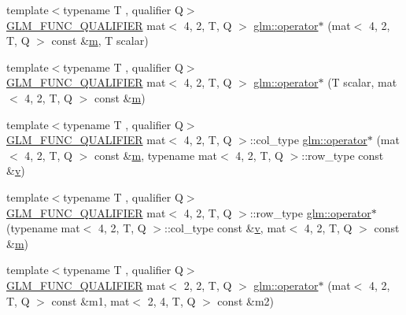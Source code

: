\begin{DoxyCompactItemize}
\item 
{\footnotesize template$<$typename T , qualifier Q$>$ }\\\hyperlink{setup_8hpp_a33fdea6f91c5f834105f7415e2a64407}{G\+L\+M\+\_\+\+F\+U\+N\+C\+\_\+\+Q\+U\+A\+L\+I\+F\+I\+ER} mat$<$ 4, 2, T, Q $>$ \hyperlink{namespaceglm_a09d03d89ff90db594947d1f1343e1b91}{glm\+::operator$\ast$} (mat$<$ 4, 2, T, Q $>$ const \&\hyperlink{_s_d_l__opengl__glext_8h_af593500c283bf1a787a6f947f503a5c2}{m}, T scalar)
\item 
{\footnotesize template$<$typename T , qualifier Q$>$ }\\\hyperlink{setup_8hpp_a33fdea6f91c5f834105f7415e2a64407}{G\+L\+M\+\_\+\+F\+U\+N\+C\+\_\+\+Q\+U\+A\+L\+I\+F\+I\+ER} mat$<$ 4, 2, T, Q $>$ \hyperlink{namespaceglm_a4d746e28b9997c4e8223605503469343}{glm\+::operator$\ast$} (T scalar, mat$<$ 4, 2, T, Q $>$ const \&\hyperlink{_s_d_l__opengl__glext_8h_af593500c283bf1a787a6f947f503a5c2}{m})
\item 
{\footnotesize template$<$typename T , qualifier Q$>$ }\\\hyperlink{setup_8hpp_a33fdea6f91c5f834105f7415e2a64407}{G\+L\+M\+\_\+\+F\+U\+N\+C\+\_\+\+Q\+U\+A\+L\+I\+F\+I\+ER} mat$<$ 4, 2, T, Q $>$\+::col\+\_\+type \hyperlink{namespaceglm_ab725c78a04cf5086bee0142b78db06b7}{glm\+::operator$\ast$} (mat$<$ 4, 2, T, Q $>$ const \&\hyperlink{_s_d_l__opengl__glext_8h_af593500c283bf1a787a6f947f503a5c2}{m}, typename mat$<$ 4, 2, T, Q $>$\+::row\+\_\+type const \&\hyperlink{_s_d_l__opengl_8h_a10a82eabcb59d2fcd74acee063775f90}{v})
\item 
{\footnotesize template$<$typename T , qualifier Q$>$ }\\\hyperlink{setup_8hpp_a33fdea6f91c5f834105f7415e2a64407}{G\+L\+M\+\_\+\+F\+U\+N\+C\+\_\+\+Q\+U\+A\+L\+I\+F\+I\+ER} mat$<$ 4, 2, T, Q $>$\+::row\+\_\+type \hyperlink{namespaceglm_a02482786cbe88dfee0958c191208d920}{glm\+::operator$\ast$} (typename mat$<$ 4, 2, T, Q $>$\+::col\+\_\+type const \&\hyperlink{_s_d_l__opengl_8h_a10a82eabcb59d2fcd74acee063775f90}{v}, mat$<$ 4, 2, T, Q $>$ const \&\hyperlink{_s_d_l__opengl__glext_8h_af593500c283bf1a787a6f947f503a5c2}{m})
\item 
{\footnotesize template$<$typename T , qualifier Q$>$ }\\\hyperlink{setup_8hpp_a33fdea6f91c5f834105f7415e2a64407}{G\+L\+M\+\_\+\+F\+U\+N\+C\+\_\+\+Q\+U\+A\+L\+I\+F\+I\+ER} mat$<$ 2, 2, T, Q $>$ \hyperlink{namespaceglm_ad5c9c12705ae119e5492249507e7c6ca}{glm\+::operator$\ast$} (mat$<$ 4, 2, T, Q $>$ const \&m1, mat$<$ 2, 4, T, Q $>$ const \&m2)

\end{DoxyCompactItemize}
